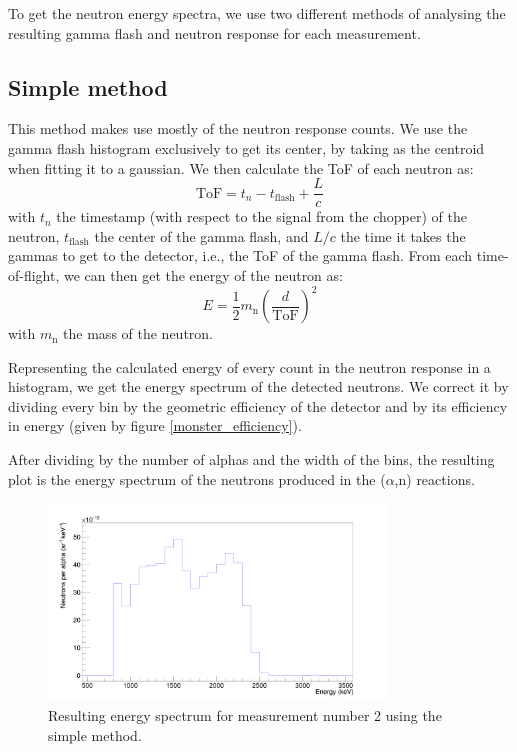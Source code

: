 \documentclass[a4paper,12pt]{report}
\newcommand{\an}{($\alpha$,n) }
\begin{document}
To get the neutron energy spectra, we use two different methods of analysing the resulting gamma flash and neutron response for each measurement.

\subsection{Simple method}
This method makes use mostly of the neutron response counts.
We use the gamma flash histogram exclusively to get its center, by taking as the centroid when fitting it to a gaussian.
We then calculate the ToF of each neutron as:
\begin{equation}
	\text{ToF} = t_n-t_\text{flash}+\frac{L}{c}
\end{equation}
with $t_n$ the timestamp (with respect to the signal from the chopper) of the neutron, $t_\text{flash}$ the center of the gamma flash, and $L/c$ the time it takes the gammas to get to the detector, i.e., the ToF of the gamma flash.
From each time-of-flight, we can then get the energy of the neutron as:
\begin{equation}
	E=\frac{1}{2} m_\text{n} \left( \frac{d}{\text{ToF}} \right)^2
\end{equation}
with $m_\text{n}$ the mass of the neutron.

Representing the calculated energy of every count in the neutron response in a histogram, we get the energy spectrum of the detected neutrons.
We correct it by dividing every bin by the geometric efficiency of the detector and by its efficiency in energy (given by figure \ref{monster_efficiency}).

After dividing by the number of alphas and the width of the bins, the resulting plot is the energy spectrum of the neutrons produced in the \an reactions.

\begin{figure}[H]
	\centering
	\includegraphics[width=0.80\textwidth]{pulsed_energysimple.png}
	\caption{Resulting energy spectrum for measurement number 2 using the simple method.}
	\label{pulsed_energysimple}
\end{figure}
\end{document}
